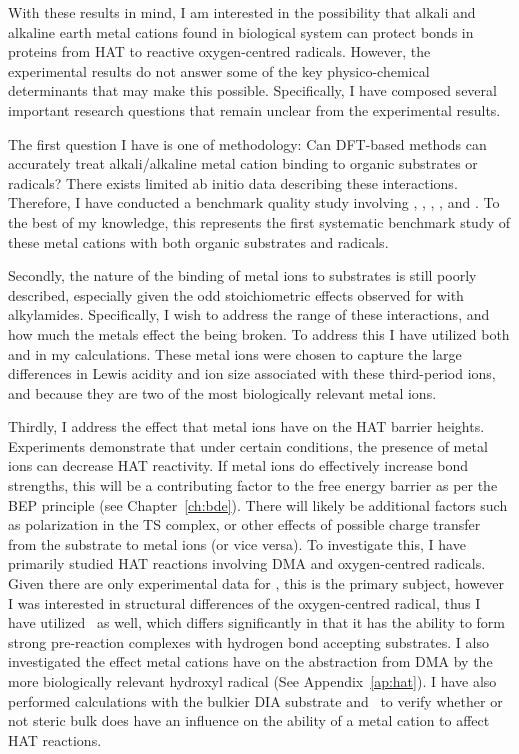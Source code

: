 \begin{doublespace}
With these results in mind, I am interested in the possibility that alkali and
alkaline earth metal cations found in biological system can protect 
bonds in proteins from HAT to reactive oxygen-centred radicals. However, the
experimental results do not answer some of the key physico-chemical determinants
that may make this possible. Specifically, I have composed several important
research questions that remain unclear from the experimental results.

The first question I have is one of methodology: Can DFT-based methods can
accurately treat alkali/alkaline metal cation binding to organic substrates or
radicals? There exists limited ab initio data describing these
interactions.\cite{ Siu2001, Corral2003, Suarez2011, Baldauf2013} Therefore, I
have conducted a benchmark quality study involving , ,
, , and . To the best of my knowledge, this
represents the first systematic benchmark study of these metal cations with both
organic substrates and radicals.

Secondly, the nature of the binding of metal ions to substrates is still poorly
described, especially given the odd stoichiometric effects observed for
 with alkylamides. Specifically, I wish to address the range of
these interactions, and how much the metals effect the  being broken. To
address this I have utilized both  and  in my calculations.
These metal ions were chosen to capture the large differences in Lewis acidity
and ion size associated with these third-period ions, and because they are two
of the most biologically relevant metal ions.

Thirdly, I address the effect that metal ions have on the HAT barrier heights.
Experiments demonstrate that under certain conditions, the presence of metal
ions can decrease HAT reactivity. If metal ions do effectively increase 
bond strengths, this will be a contributing factor to the free energy barrier as
per the BEP principle\cite{Bell1936,Evans1938} (see Chapter~\ref{ch:bde}). There
will likely be additional factors such as polarization in the TS complex, or
other effects of possible charge transfer from the substrate to metal ions (or
vice versa). To investigate this, I have primarily studied HAT reactions
involving DMA and oxygen-centred radicals. Given there are only experimental
data for \cumo, this is the primary subject, however I was interested in
structural differences of the oxygen-centred radical, thus I have utilized \bno\
as well, which differs significantly in that it has the ability to form strong
pre-reaction complexes with hydrogen bond accepting
substrates.\cite{Salamone2012, Salamone2013} I also investigated the effect
metal cations have on the abstraction from DMA by the more biologically relevant
hydroxyl radical (See Appendix~\ref{ap:hat}). I have also performed calculations
with the bulkier DIA substrate and \cumo\ to verify whether or not steric bulk
does have an influence on the ability of a metal cation to affect HAT reactions.


\end{doublespace}
